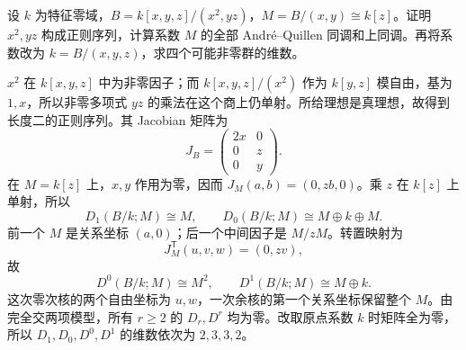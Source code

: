 \begin{exercise}\label{b3:ex:C-aq-two-relations}
	设 \(k\) 为特征零域，\(B=k[x,y,z]/(x^2,yz)\)，\(M=B/(x,y)\cong k[z]\)。证明 \(x^2,yz\) 构成正则序列，计算系数 \(M\) 的全部 André–Quillen 同调和上同调。再将系数改为 \(k=B/(x,y,z)\)，求四个可能非零群的维数。
\end{exercise}
\begin{solution}
	\(x^2\) 在 \(k[x,y,z]\) 中为非零因子；而 \(k[x,y,z]/(x^2)\) 作为 \(k[y,z]\) 模自由，基为 \(1,x\)，所以非零多项式 \(yz\) 的乘法在这个商上仍单射。所给理想是真理想，故得到长度二的正则序列。其 Jacobian 矩阵为
	\[
		J_B=\begin{pmatrix}2x&0\\0&z\\0&y\end{pmatrix}.
	\]
	在 \(M=k[z]\) 上，\(x,y\) 作用为零，因而 \(J_M(a,b)=(0,zb,0)\)。乘 \(z\) 在 \(k[z]\) 上单射，所以
	\[
		D_1(B/k;M)\cong M,\qquad D_0(B/k;M)\cong M\oplus k\oplus M.
	\]
	前一个 \(M\) 是关系坐标 \((a,0)\)；后一个中间因子是 \(M/zM\)。转置映射为
	\[
		J_M^{\mathsf T}(u,v,w)=(0,zv),
	\]
	故
	\[
		D^0(B/k;M)\cong M^2,\qquad D^1(B/k;M)\cong M\oplus k.
	\]
	这次零次核的两个自由坐标为 \(u,w\)，一次余核的第一个关系坐标保留整个 \(M\)。由完全交两项模型，所有 \(r\ge2\) 的 \(D_r,D^r\) 均为零。改取原点系数 \(k\) 时矩阵全为零，所以 \(D_1,D_0,D^0,D^1\) 的维数依次为 \(2,3,3,2\)。
\end{solution}

